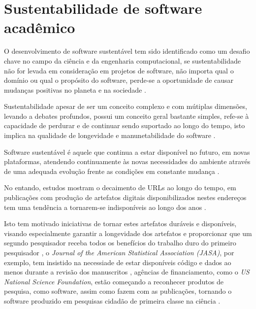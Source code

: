 \section{Sustentabilidade de software acadêmico}


O desenvolvimento de software sustentável tem sido identificado como um desafio
chave no campo da ciência e da engenharia computacional, se sustentabilidade
não for levada em consideração em projetos de software, não importa qual o
domínio ou qual o propósito do software, perde-se a oportunidade de causar
mudanças positivas no planeta e na sociedade \cite{becker2014karlskrona}.

Sustentabilidade apesar de ser um conceito complexo e com mútiplas dimensões,
levando a debates profundos, possui um conceito geral bastante simples, refe-se à
capacidade de perdurar e de continuar sendo suportado ao longo do tempo, isto
implica na qualidade de longevidade e manunetabilidade do software
\cite{venters2014software}.

Software sustentável é aquele que continua a estar disponível no futuro, em
novas plataformas, atendendo continuamente às novas necessidades do ambiente
através de uma adequada evolução frente as condições em constante mudança
\cite{allen2017engineering}.

No entando, estudos mostram o decaimento de URLs ao longo do tempo, em
publicações com produção de artefatos digitais disponibilizados nestes
endereços tem uma tendência a tornarem-se indisponíveis ao longo dos anos
\cite{wren2017use}.

Isto tem motivado iniciativas de tornar estes artefatos duráveis e disponíveis,
visando especialmente garantir a longevidade dos artefatos e proporcionar que
um segundo pesquisador receba todos os benefícios do trabalho duro do primeiro
pesquisador \cite{king1995replication},
o {\it Journal of the American Statistical Association (JASA)}, por
exemplo, tem insistido na necessiade de estar disponíveis código e dados ao
menos durante a revisão dos manuscritos \cite{baker2016scientists}, agências de
financiamento, como o {\it US National Science Foundation}, estão começando a
reconhecer produtos de pesquisa, como software, assim como fazem com as
publicações, tornando o software produzido em pesquisas cidadão de primeira
classe na ciência \cite{allen2017engineering}.

